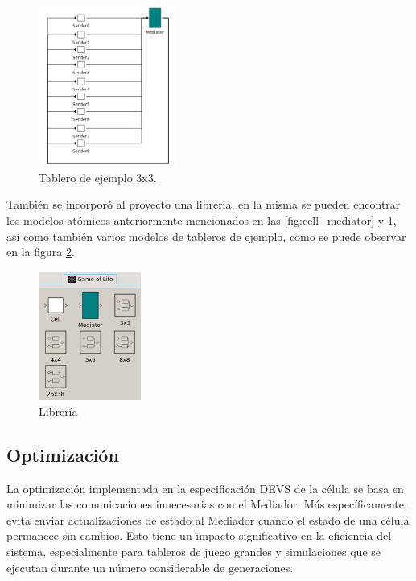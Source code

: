 \documentclass[]{article}
\begin{document}
\begin{figure}[H]
  \centering
  \includegraphics[width=0.4\textwidth]{../assets/pdevs/3x3_board.png}
  \caption{Tablero de ejemplo 3x3.}
  \label{fig:board}
\end{figure}

También se incorporó al proyecto una librería, en la misma se pueden encontrar los modelos atómicos anteriormente mencionados en las \ref{fig:cell_mediator} y \ref{fig:board}, así como también varios modelos de tableros de ejemplo, como se puede observar en la figura \ref{fig:library}.

\begin{figure}[H]
  \centering
  \includegraphics[width=0.3\textwidth]{../assets/pdevs/library.png}
  \caption{Librería}
  \label{fig:library}
\end{figure}


\subsection{Optimización}

La optimización implementada en la especificación DEVS de la célula se basa en minimizar las comunicaciones innecesarias con el Mediador. Más específicamente, evita enviar actualizaciones de estado al Mediador cuando el estado de una célula permanece sin cambios. Esto tiene un impacto significativo en la eficiencia del sistema, especialmente para tableros de juego grandes y simulaciones que se ejecutan durante un número considerable de generaciones.
\end{document}

